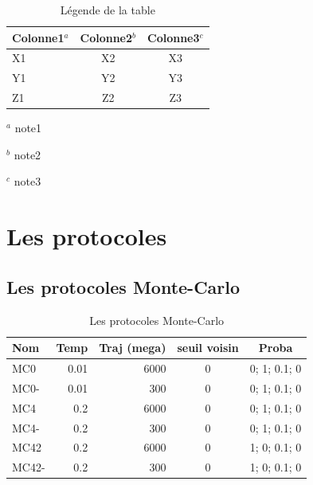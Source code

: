 \documentclass[a4paper,12pt]{book}
\begin{document}
\begin{table}[!htbp]
\centering

\caption{Légende de la table}

\vspace{2ex}
\begin{tabular}{lcc}
\hline
Colonne1$^a$ & Colonne2$^b$ & Colonne3$^c$\\
\hline
X1 & X2 & X3\\
Y1 & Y2 & Y3\\
Z1 & Z2 & Z3\\
\hline
\end{tabular}

\bigskip

{\raggedright

$^a$ note1

$^b$ note2

$^c$ note3

}

\label{tab:label_table}
\end{table}



   \section{Les protocoles} 



   \subsection{Les protocoles Monte-Carlo} 
    
    \begin{table}[!htbp]
      \centering

      \begin{tabular}{|l|r|r|c|c|}

        \hline
        Nom & Temp & Traj (mega)& seuil voisin  & Proba \\
        \hline
        MC0   & 0.01  &  6000 & 0 & 0; 1; 0.1; 0   \\  
        MC0-  & 0.01  &   300 & 0 & 0; 1; 0.1; 0   \\  
        MC4   & 0.2   &  6000 & 0 & 0; 1; 0.1; 0   \\          
        MC4-  & 0.2   &   300 & 0 & 0; 1; 0.1; 0   \\ 
        MC42  & 0.2   &  6000 & 0 & 1; 0; 0.1; 0   \\        
        MC42- & 0.2   &   300 & 0 & 1; 0; 0.1; 0   \\   \hline                   

       
      \end{tabular}      
      \caption{Les protocoles Monte-Carlo}
      \label{tab_protoMC}      
    \end{table}
\end{document}
